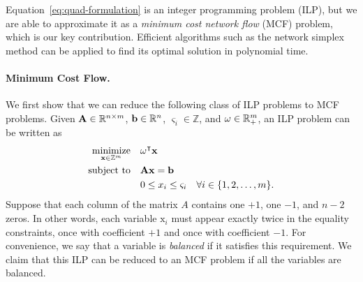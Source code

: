 Equation~\eqref{eq:quad-formulation} is an integer programming problem (ILP), but we are able to approximate it as a \emph{minimum cost network flow} (MCF) problem, which is our key contribution. Efficient algorithms such as the network simplex method \cite{orlin1997polynomial} can be applied to find its optimal solution in polynomial time.

\paragraph*{Minimum Cost Flow.}
\label{sec:mincost}


We first show that we can reduce the following class of ILP problems to MCF problems. Given $\mathbf{A} \in \mathbb{R}^{n \times m}$, $\mathbf{b} \in \mathbb{R}^{n}$, $\varsigma_i \in \mathbb{Z}$, and $\mathbf{\omega} \in \mathbb{R}^{m}_+$, an ILP problem can be written as
\begin{equation}
\begin{split}
\operatorname*{minimize}_{\mathbf{x} \in \mathbb{Z}^m} \quad & \mathbf{\omega}^\intercal \mathbf{x} \\
\text{subject to} \quad & \mathbf{Ax} = \mathbf{b} \\
& 0 \le x_i \le \varsigma_i \quad \forall i \in \{1, 2, \dots, m\}.
\end{split}
\label{eq:quad-ilp}
\end{equation}
Suppose that each column of the matrix $A$ contains one $+1$, one $-1$, and $n-2$ zeros. In other words, each variable $\mathrm{x}_i$ must appear exactly twice in the equality constraints, once with coefficient $+1$ and once with coefficient $-1$. For convenience, we say that a variable is \emph{balanced} if it satisfies this requirement. We claim that this ILP can be reduced to an MCF problem if all the variables are balanced.  

